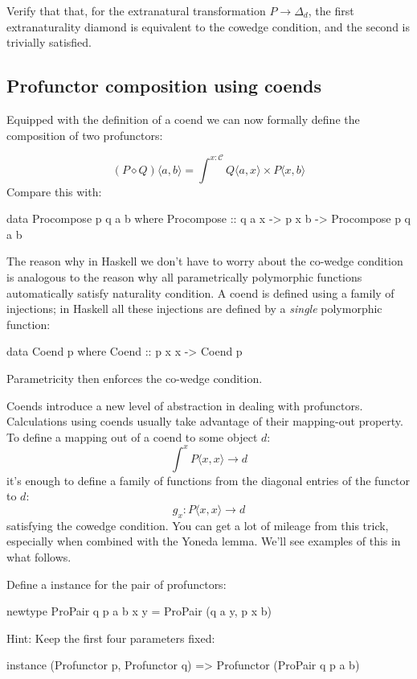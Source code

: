 \documentclass[DaoFP]{subfiles}
\begin{document}
\begin{exercise}
Verify that that, for the extranatural transformation $P \to \Delta_d$, the first extranaturality diamond is equivalent to the cowedge condition, and the second is trivially satisfied.
\end{exercise}

\subsection{Profunctor composition using coends}

Equipped with the definition of a coend we can now formally define the composition of two profunctors:

\[ (P \diamond Q)\langle a, b \rangle = \int^{x\colon \mathcal{C}} Q \langle a, x \rangle \times P \langle x, b \rangle\]
Compare this with:
\begin{haskell}
data Procompose p q a b where
  Procompose ::  q a x -> p x b -> Procompose p q a b
\end{haskell}

The reason why in Haskell we don't have to worry about the co-wedge condition is analogous to the reason why all parametrically polymorphic functions automatically satisfy naturality condition. A coend is defined using a family of injections; in Haskell all these injections are defined by a \emph{single} polymorphic function:
\begin{haskell}
data Coend p where
  Coend ::  p x x -> Coend p
\end{haskell}
Parametricity then enforces the co-wedge condition.

Coends introduce a new level of abstraction in dealing with profunctors. Calculations using coends usually take advantage of their mapping-out property. To define a mapping out of a coend to some object $d$:
\[ \int^x P \langle x, x \rangle \to d \]
 it's enough to define a family of functions from the diagonal entries of the functor to $d$:
 \[ g_x \colon P \langle x, x \rangle \to d \]
 satisfying the cowedge condition. You can get a lot of mileage from this trick, especially when combined with the Yoneda lemma. We'll see examples of this in what follows.

\begin{exercise}
Define a  instance for the pair of profunctors:
\begin{haskell}
newtype ProPair q p a b x y = ProPair (q a y, p x b)
\end{haskell}
Hint: Keep the first four parameters fixed:
\begin{haskell}
instance (Profunctor p, Profunctor q) => Profunctor (ProPair q p a b)
\end{haskell}
\end{exercise}
\end{document}
